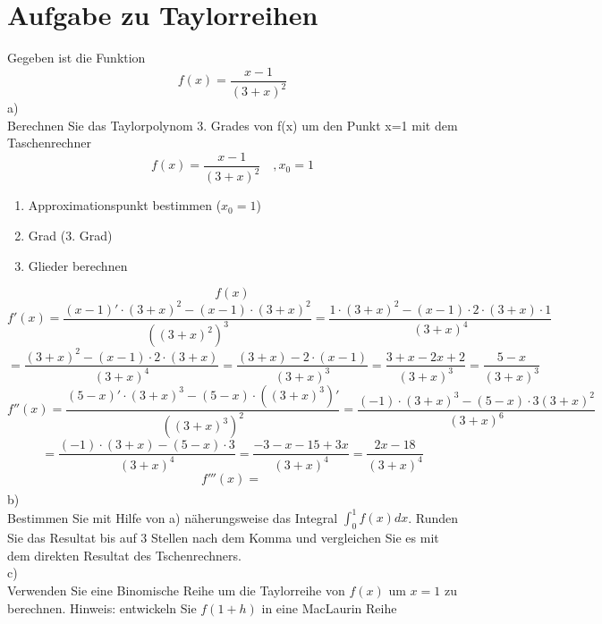 



\section{Aufgabe zu Taylorreihen}
Gegeben ist die Funktion 
\[ f(x) = \frac{x-1}{(3+x)^2} \]
a)\\
Berechnen Sie das Taylorpolynom 3. Grades von f(x) um den Punkt x=1 mit dem Taschenrechner
\[ f(x) = \frac{x - 1}{(3 + x)^2}\quad , x_0 = 1 \]
\begin{enumerate}
  \item Approximationspunkt bestimmen ($x_0 = 1$)
  \item Grad (3. Grad)
  \item Glieder berechnen
\end{enumerate}
\[ f(x) \]
\[ f'(x) = \frac{(x - 1)' \cdot (3 + x)^2 - (x - 1) \cdot (3 + x)^2}{((3 + x)^2)^3} = \frac{1 \cdot (3 + x)^2 - (x - 1) \cdot 2 \cdot (3 + x) \cdot 1}{(3 + x)^4} \]
\[ = \frac{(3 + x)^2 - (x - 1) \cdot 2 \cdot (3 + x)}{(3 + x)^4} = \frac{(3 + x) - 2 \cdot (x - 1)}{(3 + x)^3} = \frac{3 + x - 2x + 2}{(3 + x)^3} = \frac{5 - x}{(3 + x)^3} \]
\[ f''(x) = \frac{(5 - x)' \cdot (3 + x)^3 - (5 - x)\cdot((3 + x)^3)'}{((3 + x)^3)^2} = \frac{(-1) \cdot (3 + x)^3 - (5 - x)\cdot3(3 + x)^2}{(3 + x)^6} \]
\[ = \frac{(-1) \cdot (3 + x) - (5 - x) \cdot 3}{(3 + x)^4} = \frac{-3 - x - 15 + 3x}{(3 + x)^4} = \frac{2x - 18}{(3 + x)^4} \]
\[ f'''(x) = \frac{}{} \]
\[  \]
\[  \]
\[  \]
\[  \]
\[  \]
\[  \]
\[  \]
\[  \]
b)\\
Bestimmen Sie mit Hilfe von a) näherungsweise das Integral $\int_0^1 f(x) dx$. Runden Sie das Resultat bis auf 3 Stellen nach dem Komma und vergleichen Sie es mit dem direkten Resultat des Tschenrechners. 
\[  \]
\[  \]
\[  \]
c)\\
Verwenden Sie eine Binomische Reihe um die Taylorreihe von $f(x)$ um $x=1$ zu berechnen. Hinweis: entwickeln Sie $f(1+h)$ in eine MacLaurin Reihe
\[  \]
\[  \]
\[  \]